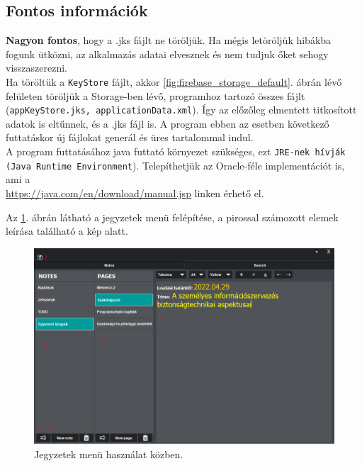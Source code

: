 \subsection{Fontos információk}
\textbf{Nagyon fontos}, hogy a .jks fájlt ne töröljük. Ha mégis letöröljük hibákba fogunk ütközni, az alkalmazás adatai elvesznek és nem tudjuk őket sehogy visszaszerezni.
\vspace{5pt}\\Ha töröltük a \texttt{KeyStore} fájlt, akkor \ref{fig:firebase_storage_default}. ábrán lévő felületen töröljük a Storage-ben lévő, programhoz tartozó összes fájlt (\texttt{appKeyStore.jks, applicationData.xml}). Így az előzőleg elmentett titkosított adatok is eltűnnek, és a .jks fájl is. A program ebben az esetben következő futtatáskor új fájlokat generál és üres tartalommal indul.
\vspace{5pt}\\A program futtatásához java futtató környezet szükséges, ezt \texttt{JRE-nek hívják (Java Runtime Environment}). Telepíthetjük az Oracle-féle implementációt is, ami a \\ \href{https://java.com/en/download/manual.jsp}{https://java.com/en/download/manual.jsp} linken érhető el.

\vspace{30pt}

Az \ref{fig:menu_notes_2}. ábrán látható a jegyzetek menü felépítése, a pirossal számozott elemek leírása található a kép alatt.

\begin{figure}[h]
	\centering
	\includegraphics[scale=0.5]{images/doc_1.png}
	\caption{Jegyzetek menü használat közben.}
	\label{fig:menu_notes_2}
\end{figure}

